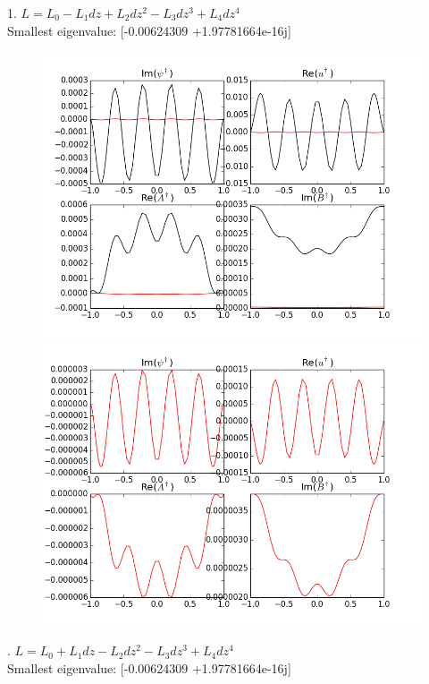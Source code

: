 \documentclass[letterpaper,12pt]{article}
\begin{document}
1. $L = L_0 - L_1 dz + L_2 dz^2 - L_3 dz^3 + L_4 dz^4$ \\

Smallest eigenvalue: [-0.00624309 +1.97781664e-16j] \\

\begin{figure}[h!]
\centering
\includegraphics[scale=0.5]{ah_attempt1}
\includegraphics[scale=0.5]{ah_attempt1_redonly}
\end{figure}

. $L = L_0 + L_1 dz - L_2 dz^2 - L_3 dz^3 + L_4 dz^4$ \\

Smallest eigenvalue: [-0.00624309 +1.97781664e-16j] \\
\end{document}
